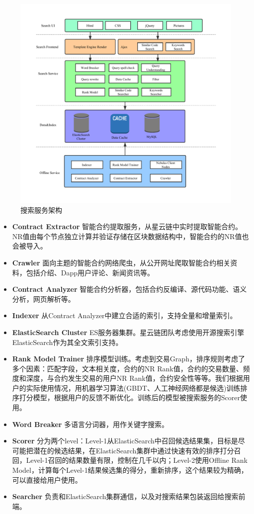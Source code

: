 \begin{figure}[h]
\centering
\includegraphics[width=16cm]{./figs/search-arch.pdf}
\caption{搜索服务架构}
\label{fig:search-arch}
\end{figure}

\begin{itemize}
	\item \textbf{Contract Extractor} 智能合约提取服务，从星云链中实时提取智能合约。NR值由每个节点独立计算并验证存储在区块数据结构中，智能合约的NR值也会被导入。
	\item \textbf{Crawler} 面向主题的智能合约网络爬虫，从公开网址爬取智能合约相关资料，包括介绍、Dapp用户评论、新闻资讯等。
	\item \textbf{Contract Analyzer} 智能合约分析器，包括合约反编译、源代码功能、语义分析，网页解析等。
	\item \textbf{Indexer} 从Contract Analyzer中建立合适的索引，支持全量和增量索引。
	\item \textbf{ElasticSearch Cluster} ES服务器集群。星云链团队考虑使用开源搜索引擎ElasticSearch作为其全文索引支持。
	\item \textbf{Rank Model Trainer} 排序模型训练。考虑到交易Graph，排序规则考虑了多个因素：匹配字段，文本相关度，合约的NR Rank值，合约的交易数量、频度和深度，与合约发生交易的用户NR Rank值，合约安全性等等。我们根据用户的实际使用情况，用机器学习算法(GBDT、人工神经网络都是候选)训练排序打分模型，根据用户的反馈不断优化。训练后的模型被搜索服务的Scorer使用。
	\item \textbf{Word Breaker} 多语言分词器，用作关键字搜索。
	\item \textbf{Scorer} 分为两个level：Level-1从ElasticSearch中召回候选结果集，目标是尽可能把潜在的候选结果，在ElasticSearch集群中通过快速有效的排序打分召回，Level-1召回的结果数量有限，控制在几千以内；Level-2使用Offline Rank Model，计算每个Level-1结果候选集的得分，重新排序，这个结果较为精确，可以直接给用户使用。
	\item \textbf{Searcher} 负责和ElasticSearch集群通信，以及对搜索结果包装返回给搜索前端。
\end{itemize}

